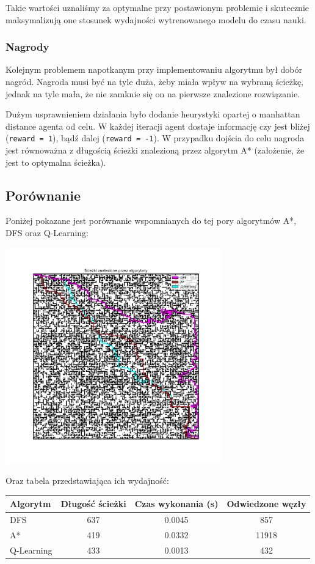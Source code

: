\documentclass[a4paper,12pt]{article}
\begin{document}
    Takie wartości uznaliśmy za optymalne przy postawionym problemie i skutecznie maksymalizują one stosunek wydajności wytrenowanego modelu do czasu nauki.

    \subsubsection{Nagrody}
    Kolejnym problemem napotkanym przy implementowaniu  algorytmu był dobór nagród.
    Nagroda musi być na tyle duża, żeby miała wpływ na wybraną ścieżkę, jednak na tyle mała, że nie zamknie się on na pierwsze znalezione rozwiązanie.
    
    Dużym usprawnieniem działania było dodanie heurystyki opartej o manhattan distance agenta od celu.
    W każdej iteracji agent dostaje informację czy jest bliżej (\texttt{reward = 1}), bądź dalej (\texttt{reward = -1}).
    W przypadku dojścia do celu nagroda jest równoważna z długością ścieżki znalezioną przez algorytm A* (założenie, że jest to optymalna ścieżka).

    \newpage
    \subsection{Porównanie}
	Poniżej pokazane jest porównanie wspomnianych do tej pory algorytmów A*, DFS oraz Q-Learning:
    \begin{center}
        \includegraphics[width=0.7\textwidth]{../images/qlearning-vs-others.png}    
    \end{center}

    Oraz tabela przedstawiająca ich wydajność:
    \begin{table}[h!]
\centering
\begin{tabular}{|l|c|c|c|}
\hline
\textbf{Algorytm} & \textbf{Długość ścieżki} & \textbf{Czas wykonania (s)} & \textbf{Odwiedzone węzły} \\
\hline
DFS        & 637  & 0.0045  & 857    \\
A*         & 419  & 0.0332  & 11918  \\
Q-Learning & 433  & 0.0013  & 432    \\
\hline
\end{tabular}
\end{table}
\end{document}
